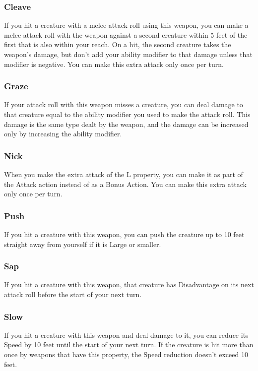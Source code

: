\documentclass[10pt,a4paper,twoside,bg=print,twocolumn,openany,nodeprecatedcode]{dndbook}
\begin{document}
\subsubsection{Cleave}
If you hit a creature with a melee attack roll using this weapon, you can make a melee attack roll with the weapon against a second creature within 5 feet of the first that is also within your reach. On a hit, the second creature takes the weapon's damage, but don't add your ability modifier to that damage unless that modifier is negative. You can make this extra attack only once per turn.

\subsubsection{Graze}
If your attack roll with this weapon misses a creature, you can deal damage to that creature equal to the ability modifier you used to make the attack roll. This damage is the same type dealt by the weapon, and the damage can be increased only by increasing the ability modifier.

\subsubsection{Nick}
When you make the extra attack of the L property, you can make it as part of the Attack action instead of as a Bonus Action. You can make this extra attack only once per turn.

\subsubsection{Push}
If you hit a creature with this weapon, you can push the creature up to 10 feet straight away from yourself if it is Large or smaller.

\subsubsection{Sap}
If you hit a creature with this weapon, that creature has Disadvantage on its next attack roll before the start of your next turn.

\subsubsection{Slow}
If you hit a creature with this weapon and deal damage to it, you can reduce its Speed by 10 feet until the start of your next turn. If the creature is hit more than once by weapons that have this property, the Speed reduction doesn't exceed 10 feet.
\end{document}
